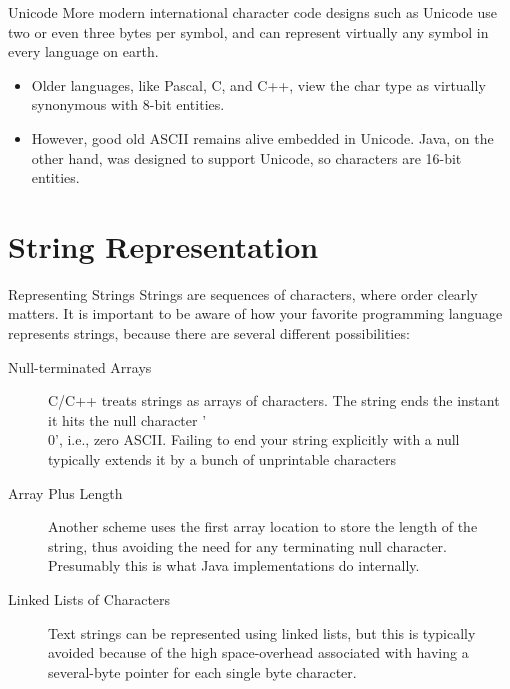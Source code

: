 \documentclass{beamer}
\begin{document}
\begin{frame}{Unicode}
  More modern international character code designs such as Unicode use two or even three bytes per symbol, and can represent virtually any symbol in every language on earth.
  \begin{itemize}
  \item Older languages, like Pascal, C, and C++, view the char type as virtually synonymous with 8-bit entities.
  \item However, good old ASCII remains alive embedded in Unicode. Java, on the other hand, was designed to support Unicode, so characters are 16-bit entities.
  \end{itemize}


\end{frame}

\section{String Representation}


\begin{frame}{Representing Strings}
 Strings are sequences of characters, where order clearly matters.
 It is important to be aware of how your favorite programming language represents strings, because there are several different possibilities:
 \begin{description}
 \item[Null-terminated Arrays] C/C++ treats strings as arrays of characters.
  The string ends the instant it hits the null character '\\0', i.e., zero ASCII.
  Failing to end your string explicitly with a null typically extends it by a bunch of unprintable characters
 \item[Array Plus Length] Another scheme uses the first array location to store the length of the string, thus avoiding the need for any terminating null character.
  Presumably this is what Java implementations do internally.
 \item[Linked Lists of Characters] Text strings can be represented using linked lists, but this is typically avoided because of the high space-overhead associated with having a several-byte pointer for each single byte character.
 \end{description}


\end{frame}
\end{document}
